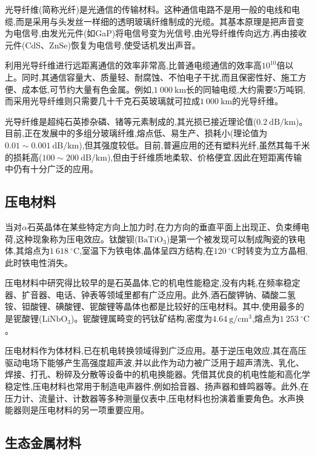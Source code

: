 \documentclass[UTF8]{ctexbook}
\newcommand{\◎}{\ensuremath{\bigcirc}}
\begin{document}
光导纤维(简称光纤)是光通信的传输材料。这种通信电路不是用一般的电线和电缆,而是采用与头发丝一样细的透明玻璃纤维制成的光缆。其基本原理是把声音变为电信号,由发光元件(如GaP)将电信号变为光信号,由光导纤维传向远方,再由接收元件(CdS、ZnSe)恢复为电信号,使受话机发出声音。

利用光导纤维进行远距离通信的效率非常高,比普通电缆通信的效率高$10^{10}$倍以上。同时,其通信容量大、质量轻、耐腐蚀、不怕电子干扰,而且保密性好、施工方便、成本低,可节约大量有色金属。例如,$1~000~\mathrm{km}$长的同轴电缆,大约需要5万吨铜,而采用光导纤维则只需要几十千克石英玻璃就可拉成$1~000~\mathrm{km}$的光导纤维。

光导纤维是超纯石英掺杂磷、锗等元素制成的,其光损已接近理论值($0.2~\mathrm{dB/km}$)。目前,正在发展中的多组分玻璃纤维,熔点低、易生产、损耗小(理论值为$0.01\sim0.001~\mathrm{dB/km}$),但其强度较低。目前,普遍应用的还有塑料光纤,虽然其每千米的损耗高($100\sim200~\mathrm{dB/km}$),但由于纤维质地柔软、价格便宜,因此在短距离传输中仍有十分广泛的应用。

\subsection{压电材料}

当对$\alpha$石英晶体在某些特定方向上加力时,在力方向的垂直平面上出现正、负束缚电荷,这种现象称为压电效应。钛酸钡($\mathrm{BaTiO_3}$)是第一个被发现可以制成陶瓷的铁电体,其熔点为$1~618~^\circ\mathrm{C}$,室温下为铁电体,晶体呈四方结构,在$120~^\circ\mathrm{C}$时转变为立方晶相,此时铁电性消失。

压电材料中研究得比较早的是石英晶体,它的机电性能稳定,没有内耗,在频率稳定器、扩音器、电话、钟表等领域里都有广泛应用。此外,酒石酸钾钠、磷酸二氢铵、钽酸锂、碘酸锂、铌酸锂等晶体也都是比较好的压电材料。其中,使用最多的是铌酸锂($\mathrm{LiNbO_3}$)。铌酸锂属畸变的钙钛矿结构,密度为$4.64~\mathrm{g/cm^3}$,熔点为$1~253~^\circ\mathrm{C}$。

压电材料作为体材料,已在机电转换领域得到广泛应用。基于逆压电效应,其在高压驱动电场下能够产生高强度超声波,并以此作为动力被广泛用于超声清洗、乳化、焊接、打孔、粉碎及分散等设备中的机电换能器。凭借其优良的机电性能和高化学稳定性,压电材料也常用于制造电声器件,例如拾音器、扬声器和蜂鸣器等。此外,在压力计、流量计、计数器等多种测量仪表中,压电材料也扮演着重要角色。水声换能器则是压电材料的另一项重要应用。

\subsection{生态金属材料}
\end{document}
